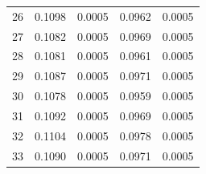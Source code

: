 \begin{table}
\begin{tabular}{c r@{$\; \pm \;$}l r@{$\; \pm \;$}l}
26 & 0.1098 & 0.0005 & 0.0962 & 0.0005 \\
27 & 0.1082 & 0.0005 & 0.0969 & 0.0005 \\
28 & 0.1081 & 0.0005 & 0.0961 & 0.0005 \\
29 & 0.1087 & 0.0005 & 0.0971 & 0.0005 \\
30 & 0.1078 & 0.0005 & 0.0959 & 0.0005 \\
31 & 0.1092 & 0.0005 & 0.0969 & 0.0005 \\
32 & 0.1104 & 0.0005 & 0.0978 & 0.0005 \\
33 & 0.1090 & 0.0005 & 0.0971 & 0.0005 \\

\end{tabular}
\end{table}
